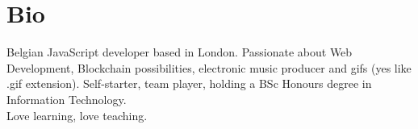 \documentclass[]{my-resume}
\begin{document}
\begin{minipage}[t]{0.33\textwidth}

\section{Bio}
Belgian JavaScript developer based in London. Passionate about Web Development, Blockchain possibilities, electronic music producer and gifs (yes like .gif extension).
Self-starter, team player, holding a BSc Honours degree in Information Technology.\\
Love learning, love teaching.
\sectionsep


\end{minipage} 
\hfill
\end{document}
